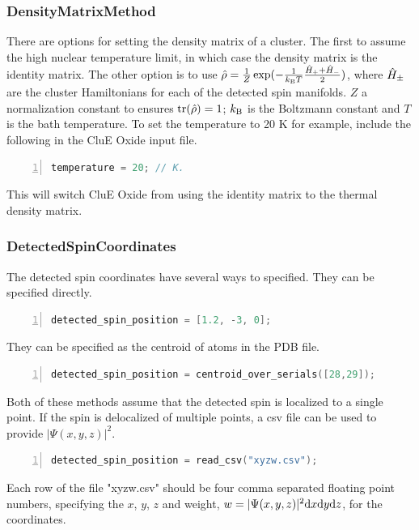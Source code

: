 \documentclass{book}
\begin{document}
\subsubsection{DensityMatrixMethod} %
There are options for setting the density matrix of a cluster.  
The first to assume the high nuclear temperature limit, in which case the 
density matrix is the identity matrix.  
The other option is to use 
$\hat{\rho} 
= \frac{1}{Z}\exp(-\frac{1}{k_\text{B} T}\frac{\hat{H}_{+} + \hat{H}_{-}}{2} )$,
where $\hat{H}_{\pm}$ are the cluster Hamiltonians for each of the detected spin
manifolds.  $Z$ a normalization constant to ensures $\text{tr}(\hat{\rho}) = 1$;
$k_\text{B}$ is the Boltzmann constant and $T$ is the bath temperature.
To set the temperature to 20 K for example, include the following in the
CluE Oxide input file.  
\begin{lstlisting}[frame=single,numbers=left,language=c]
temperature = 20; // K.
\end{lstlisting}
This will switch CluE Oxide from using the identity matrix to the thermal 
density matrix. 

\subsubsection{DetectedSpinCoordinates} %
The detected spin coordinates have several ways to specified.
They can be specified directly.
\begin{lstlisting}[frame=single,numbers=left,language=c]
detected_spin_position = [1.2, -3, 0];
\end{lstlisting}
They can be specified as the centroid of atoms in the PDB file.
\begin{lstlisting}[frame=single,numbers=left,language=c]
detected_spin_position = centroid_over_serials([28,29]);
\end{lstlisting}
Both of these methods assume that the detected spin is localized to a single
point.  If the spin is delocalized of multiple points, a csv file can be used
to provide $|\Psi(x,y,z)|^2$.  
\begin{lstlisting}[frame=single,numbers=left,language=c]
detected_spin_position = read_csv("xyzw.csv");
\end{lstlisting}
Each row of the file "xyzw.csv" should be four comma separated floating point
numbers, specifying the $x$, $y$, $z$ and weight,
$w = |\Psi(x,y,z)|^2 \text{d} x \text{d} y \text{d} z$, for the coordinates.
\end{document}
